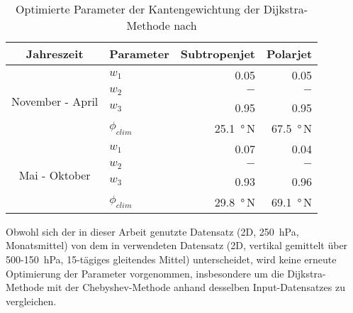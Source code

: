 \begin{table}[htb]
  \caption[Parameter der Kantengewichtung der Dijkstra-Methode]{Optimierte Parameter der Kantengewichtung der Dijkstra-Methode nach \citet{molnos-2017}}
\centering
\begin{tabular}{|cl|rr|}
  \hline
  Jahreszeit & Parameter & Subtropenjet & Polarjet \\
  \hline
  \multirow{4}{*}{November - April} 
    & $w_1$ & \num{0.05} & \num{0,05} \\
    & $w_2$ & $-$ & $-$ \\
    & $w_3$ & \num{0,95} & \num{0,95} \\
    & $\phi_{clim}$ & \SI{25.1}{\degree}\,N & \SI{67.5}{\degree}\,N \\
  \hline
  \multirow{4}{*}{Mai - Oktober} 
    & $w_1$ & \num{0,07} & \num{0,04} \\
    & $w_2$ & $-$ & $-$ \\
    & $w_3$ & \num{0,93} & \num{0,96} \\
    & $\phi_{clim}$ & \SI{29.8}{\degree}\,N & \SI{69.1}{\degree}\,N \\
  \hline
\end{tabular}
\label{tab:dijkstra}
\end{table}

Obwohl sich der in dieser Arbeit genutzte Datensatz (2D, \SI{250}{\hecto\pascal}, Monatsmittel) von dem in \citet{molnos-2017} verwendeten Datensatz (2D, vertikal gemittelt über \num{500}-\SI{150}{\hecto\pascal}, 15-tägiges gleitendes Mittel) unterscheidet, wird keine erneute Optimierung der Parameter vorgenommen, insbesondere um die Dijkstra-Methode mit der Chebyshev-Methode anhand desselben Input-Datensatzes zu vergleichen. 

